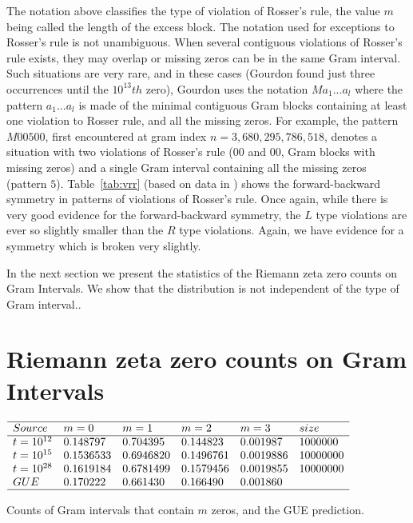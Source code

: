 \documentclass[twoside]{article}
\begin{document}
The notation above classifies the type of violation of Rosser's rule, the value $m$ being called the length of the excess block. The notation used for exceptions to Rosser's rule is not unambiguous. When several contiguous violations of Rosser's rule exists, they may overlap or missing zeros can be in the same Gram interval. Such situations are very rare, and in these cases (Gourdon found just three occurrences until the $10^{13}th$ zero), Gourdon uses the notation $Ma_1 ...a_l$ where the pattern $a_1 . . . a_l$ is made of the minimal contiguous Gram blocks containing at least one violation to Rosser rule, and all the missing zeros. For example, the pattern $M00500$, first encountered at gram index $n = 3,680,295,786,518$, denotes a situation with two violations of Rosser's rule ($00$ and $00$, Gram blocks with missing zeros) and a single Gram interval containing all the missing zeros (pattern $5$). 
Table~\ref{tab:vrr}  (based on data in \cite{gourdon}) shows the forward-backward symmetry in patterns of violations of Rosser's rule. Once again, while there is very good evidence for the forward-backward symmetry, the $L$ type violations are ever so slightly smaller than the $R$ type violations. Again, we have evidence for a symmetry which is broken very slightly.

In the next section we present the statistics of the Riemann zeta zero counts on Gram Intervals. We show that the distribution is not independent of the type of Gram interval..

\section{\label{sec5}Riemann zeta zero counts on Gram Intervals}

\begin{table}
\centering \(\begin{array}{llllll}
\hline
Source &m = 0&m = 1&m = 2&m = 3&size\\
\hline
t = 10^{12}&0.148797&0.704395&0.144823&0.001987&1000000\\
t = 10^{15}&0.1536533&0.6946820&0.1496761&0.0019886&10000000\\
t = 10^{28}&0.1619184&0.6781499&0.1579456&0.0019855&10000000\\
 GUE&0.170222&0.661430&0.166490&0.001860&\\
\hline
\end{array}\)
\caption{Counts of Gram intervals that contain $m$ zeros, and the GUE prediction.} \label{tab:intervalzeros}
\end{table}
\end{document}
